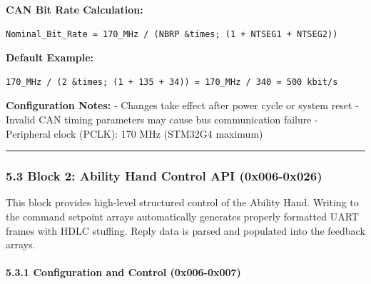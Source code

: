 \documentclass[
  11pt,
]{article}
\begin{document}
\textbf{CAN Bit Rate Calculation:}

\begin{verbatim}
Nominal_Bit_Rate = 170_MHz / (NBRP &times; (1 + NTSEG1 + NTSEG2))
\end{verbatim}

\textbf{Default Example:}

\begin{verbatim}
170_MHz / (2 &times; (1 + 135 + 34)) = 170_MHz / 340 = 500 kbit/s
\end{verbatim}

\textbf{Configuration Notes:} - Changes take effect after power cycle or
system reset - Invalid CAN timing parameters may cause bus communication
failure - Peripheral clock (PCLK): 170 MHz (STM32G4 maximum)

\begin{center}\rule{0.5\linewidth}{0.5pt}\end{center}

\subsubsection{5.3 Block 2: Ability Hand Control API
(0x006-0x026)}\label{block-2-ability-hand-control-api-0x006-0x026}

This block provides high-level structured control of the Ability Hand.
Writing to the command setpoint arrays automatically generates properly
formatted UART frames with HDLC stuffing. Reply data is parsed and
populated into the feedback arrays.

\paragraph{5.3.1 Configuration and Control
(0x006-0x007)}\label{configuration-and-control-0x006-0x007}
\end{document}
